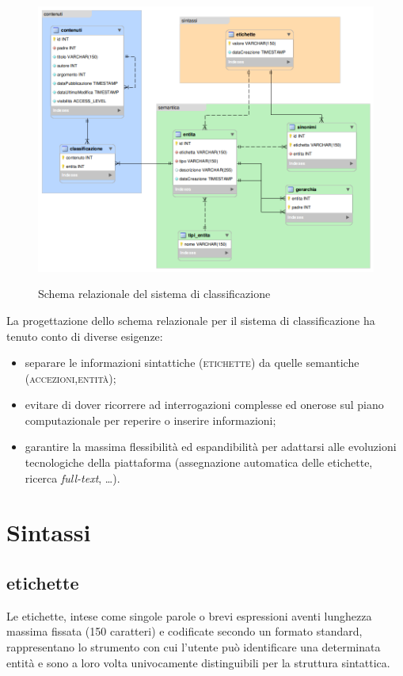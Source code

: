 \documentclass[10pt,a4paper,headinclude,footinclude,hidelinks]{scrreprt} %
\begin{document}
	\begin{figure}[ht]
		\begin{center}
	    	\includegraphics[width=14cm]{modello-er.png}
			\label{gfx:schema-relazionale}
			\caption{Schema relazionale del sistema di classificazione}
		\end{center}
	\end{figure}

	La progettazione dello schema relazionale per il sistema di classificazione ha tenuto conto di diverse esigenze:
	\begin{itemize}
	\item separare le informazioni sintattiche (\textsc{etichette}) da quelle semantiche (\textsc{accezioni},\textsc{entità});
	\item evitare di dover ricorrere ad interrogazioni complesse ed onerose sul piano computazionale per reperire o inserire informazioni;
	\item garantire la massima flessibilità ed espandibilità per adattarsi alle evoluzioni tecnologiche della piattaforma (assegnazione automatica delle etichette, ricerca \textit{full-text}, \ldots).
	\end{itemize}

	\section{Sintassi}
	\subsection{etichette}
	Le etichette, intese come singole parole o brevi espressioni aventi lunghezza massima fissata (150 caratteri) e codificate secondo un formato standard, rappresentano lo strumento con cui l'utente può identificare una determinata entità e sono a loro volta univocamente distinguibili per la struttura sintattica.
\end{document}
